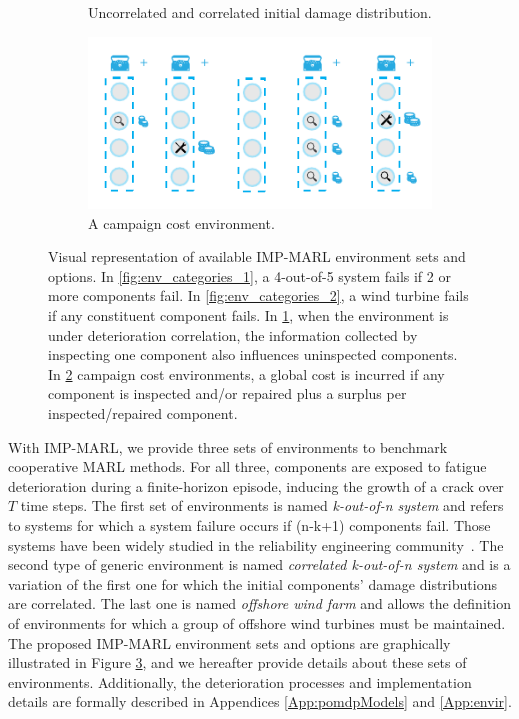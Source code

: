 \begin{figure}
\begin{subfigure}[t]{0.53\textwidth}
    \caption{Uncorrelated and correlated initial damage distribution.}
    \label{fig:env_categories_3}
\end{subfigure}%
\begin{subfigure}[t]{0.47\textwidth}
\centering
    \includegraphics[width=1\linewidth]{tex_thesis/figures/ch5/fig2_mul/environments_v2_d.pdf}
    \caption{A campaign cost environment.}
    \label{fig:env_categories_4}
\end{subfigure}
\caption{
Visual representation of available IMP-MARL environment sets and options.
In \ref{fig:env_categories_1}, a 4-out-of-5 system fails if 2 or more components fail.
In \ref{fig:env_categories_2}, a wind turbine fails if any constituent component fails.
In \ref{fig:env_categories_3}, when the environment is under deterioration correlation, the information collected by inspecting one component also influences uninspected components.
In \ref{fig:env_categories_4} campaign cost environments, a global cost is incurred if any component is inspected and/or repaired plus a surplus per inspected/repaired component. 
}
\label{fig:env_categories}
\end{figure}


With IMP-MARL, we provide three sets of environments to benchmark cooperative MARL methods.
For all three, components are exposed to fatigue deterioration during a finite-horizon episode, inducing the growth of a crack over $T$ time steps.
The first set of environments is named \textit{k-out-of-n system} and refers to systems for which a system failure occurs if (n-k+1) components fail.
Those systems have been widely studied in the reliability engineering community~\citep{barlow1984computing}. 
The second type of generic environment is named \textit{correlated k-out-of-n system} and is a variation of the first one for which the initial components' damage distributions are correlated.
The last one is named \textit{offshore wind farm} and allows the definition of environments for which a group of offshore wind turbines must be maintained.
The proposed IMP-MARL environment sets and options are graphically illustrated in Figure \ref{fig:env_categories}, and we hereafter provide details about these sets of environments.
Additionally, the deterioration processes and implementation details are formally described in Appendices \ref{App:pomdpModels} and \ref{App:envir}.

